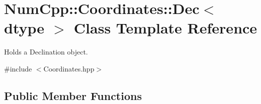 \hypertarget{class_num_cpp_1_1_coordinates_1_1_dec}{}\section{Num\+Cpp\+:\+:Coordinates\+:\+:Dec$<$ dtype $>$ Class Template Reference}
\label{class_num_cpp_1_1_coordinates_1_1_dec}


Holds a Declination object.  




{\ttfamily \#include $<$Coordinates.\+hpp$>$}

\subsection*{Public Member Functions}
